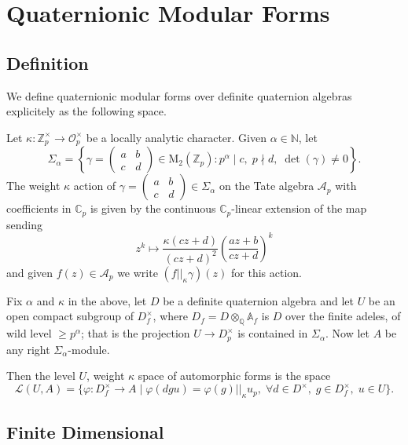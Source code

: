 \chapter{Quaternionic Modular Forms}

\section{Definition}

We define quaternionic modular forms over definite quaternion algebras explicitely as the following
space.

\begin{definition}
  Let $\kappa : \mathbb{Z}_p^\times \to \mathcal{O}_p^\times$ be a locally analytic character.
  Given $\alpha \in \mathbb{N}$, let
  \[
    \Sigma_\alpha = \left\{ \gamma =  \begin{pmatrix}
      a & b \\
      c & d
    \end{pmatrix}
    \in \text{M}_2(\mathbb{Z}_p) : p^\alpha \mid c, \; p \nmid d, \; \det (\gamma) \neq 0 \right\}.
  \]
  The weight $\kappa$ action of $\gamma =  \begin{pmatrix} a & b \\ c & d \end{pmatrix} \in
  \Sigma_\alpha$ on the Tate algebra $\mathcal{A}_p$ with coefficients in $\mathbb{C}_p$ is given by
  the continuous $\mathbb{C}_p$-linear extension of the map sending
  \[
    z^k \mapsto \frac{\kappa(c z + d)}{(cz + d)^2} \left( \frac{az+b}{cz+d} \right)^k
  \]
  and given $f(z) \in \mathcal{A}_p$ we write $(f||_\kappa \gamma)(z)$ for this action.

  Fix $\alpha$ and $\kappa$ in the above, let $D$ be a definite quaternion algebra and let $U$ be
  an open compact subgroup of $D_f^\times$, where $D_f = D  \otimes_{\mathbb{Q}} \mathbb{A}_f$ is
  $D$ over the finite adeles, of wild level $\geq p^\alpha$; that is the projection
  $U \to D_{p}^\times$ is contained in $\Sigma_\alpha.$
  Now let $A$ be any right $\Sigma_\alpha$-module.

  Then the level $U$, weight $\kappa$ space of automorphic forms is the space
  \[
    \mathcal{L}(U,A) = \{ \varphi : D_f^\times \to A  \;  | \; \varphi (dgu) = \varphi (g)
    ||_\kappa u_p, \; \forall d \in D^\times, \; g \in D^\times_f, \; u \in U \}.
  \]
\end{definition}

\section{Finite Dimensional}

